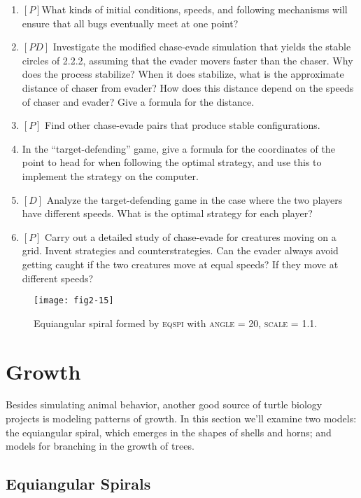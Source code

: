\documentclass{book}
\begin{document}
\begin{enumerate}
\item $[P] $What kinds of initial conditions, speeds, and following mechanisms
will ensure that all bugs eventually meet at one point?
\item $[PD]$ Investigate the modified chase-evade simulation that yields the
stable circles of 2.2.2, assuming that the evader movers faster than the
chaser. Why does the process stabilize? When it does stabilize, what is
the approximate distance of chaser from evader? How does this distance
depend on the speeds of chaser and evader? Give a formula for the
distance.  
\item $[P]$ Find other chase-evade pairs that produce stable configurations.
\item In the ``target-defending'' game, give a formula for the coordinates
of the point to head for when following the optimal strategy, and use
this to implement the strategy on the computer.  
\item $[D]$ Analyze the target-defending game in the case where the two
players have different speeds. What is the optimal strategy for each
player?  
\item $[P]$ Carry out a detailed study of chase-evade for creatures moving on
a grid. Invent strategies and counterstrategies. Can the evader always
avoid getting caught if the two creatures move at equal speeds? If they
move at different speeds?
\end{enumerate}

\begin{figure}
\begin{center}
\texttt{[image: fig2-15]}
\caption{Equiangular spiral formed by \textsc{eqspi} with \textsc{angle} = 20, \textsc{scale} = 1.1.}
\end{center}
\end{figure}

\section{Growth}

Besides simulating animal behavior, another good source of turtle biology projects is modeling patterns of growth. In this section we'll examine
two models: the equiangular spiral, which emerges in the shapes of shells
and horns; and models for branching in the growth of trees.

\subsection{Equiangular Spirals}
\end{document}
